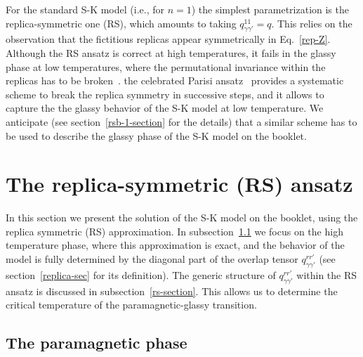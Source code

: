 \documentclass[twocolumn,superscriptaddress,prb,10pt]{revtex4-1}
\begin{document}
For the standard S-K model (i.e., for $n=1$) the simplest parametrization is the 
replica-symmetric one (RS), which amounts to taking $q^{11}_{\gamma\gamma'}=q$. 
This relies on the observation that the fictitious replicas appear symmetrically 
in Eq.~\eqref{rep-Z}. Although the RS ansatz is correct at high temperatures, it 
fails in the glassy phase at low temperatures, where the permutational invariance 
within the replicas has to be broken~\cite{almeida-1978}. the celebrated Parisi 
ansatz~\cite{parisi-1979} provides a systematic scheme to break the replica 
symmetry in successive steps, and it allows to capture the the glassy behavior of 
the S-K model at low temperature. We anticipate (see section~\ref{rsb-1-section} for 
the details) that a similar scheme has to be used to describe the glassy phase of 
the S-K model on the booklet. 


\section{The replica-symmetric (RS) ansatz}
\label{solution}

In this section we present the solution of the S-K model on the booklet, using 
the replica symmetric (RS) approximation. In subsection~\ref{para-section} we focus 
on the high temperature phase, where this approximation is exact, and the 
behavior of the model is fully determined by the diagonal part of the overlap 
tensor $q_{\gamma\gamma'}^{rr'}$ (see section~\ref{replica-sec} for its 
definition). The generic structure of $q_{\gamma\gamma'}^{rr'}$ 
within the RS ansatz  is discussed in subsection~\ref{rs-section}. This allows us 
to determine the critical temperature of the paramagnetic-glassy transition. 

\subsection{The paramagnetic phase}
\label{para-section}
\end{document}
